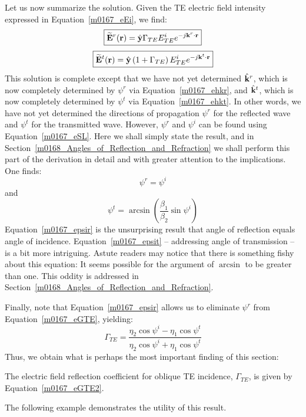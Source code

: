 Let us now summarize the solution.  Given the TE electric field intensity expressed in Equation~\ref{m0167_eEi}, we find:
%
\begin{equation}
\boxed{ \widetilde{\bf E}^r({\bf r}) = \hat{\bf y}\Gamma_{TE}E^i_{TE}e^{-j{\bf k}^r\cdot {\bf r}} }
\end{equation}
%
\begin{equation}
\boxed{ \widetilde{\bf E}^t({\bf r}) = \hat{\bf y}\left(1+\Gamma_{TE}\right)E^i_{TE}e^{-j{\bf k}^t\cdot {\bf r}} } 
\end{equation}
%
This solution is complete except that we have not yet determined 
$\hat{\bf k}^r$, which is now completely determined by $\psi^r$ via Equation~\ref{m0167_ehkr}, and
$\hat{\bf k}^t$, which is now completely determined by $\psi^t$ via Equation~\ref{m0167_ehkt}.
In other words, we have not yet determined the directions of propagation 
$\psi^r$ for the reflected wave and
$\psi^t$ for the transmitted wave.
However, $\psi^r$ and $\psi^i$ can be found using Equation~\ref{m0167_eSL}.
Here we shall simply state the result, and in Section~\ref{m0168_Angles_of_Reflection_and_Refraction} we shall perform this part of the derivation in detail and with greater attention to the implications.
One finds:
%
\begin{equation}
\psi^r = \psi^i
\label{m0167_epsir}
\end{equation}
%
and
%
\begin{equation}
\psi^t = \arcsin\left(\frac{\beta_1}{\beta_2}\sin\psi^i\right)
\label{m0167_epsit}
\end{equation}
%
Equation~\ref{m0167_epsir} is the unsurprising result that angle of reflection equals angle of incidence.
Equation~\ref{m0167_epsit} -- addressing angle of transmission -- is a bit more intriguing.  Astute readers may notice that there is something fishy about this equation: 
It seems possible for the argument of $\arcsin$ to be greater than one.
This oddity is addressed in Section~\ref{m0168_Angles_of_Reflection_and_Refraction}.

Finally, note that Equation~\ref{m0167_epsir} allows us to eliminate $\psi^r$ from Equation~\ref{m0167_eGTE}, yielding:
%
\begin{equation}
\boxed{
\Gamma_{TE} = \frac{\eta_2\cos\psi^i-\eta_1\cos\psi^t}{\eta_2\cos\psi^i+\eta_1\cos\psi^t}
}
\label{m0167_eGTE2}
\end{equation}
%
Thus, we obtain what is perhaps the most important finding of this section:
\begin{mdframed}[backgroundcolor=yellow!20,nobreak=true] 
The electric field reflection coefficient for oblique TE incidence, $\Gamma_{TE}$, is given by Equation~\ref{m0167_eGTE2}.
\end{mdframed}
The following example demonstrates the utility of this result.

